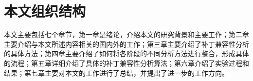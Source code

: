 \section{本文组织结构}

本文主要包括七个章节，第一章是绪论，介绍本文的研究背景和主要工作；第二章主要介绍与本文所述内容相关的国内外的工作；第三章主要介绍了补丁兼容性分析的具体方法；第四章主要介绍了如何将各阶段的不同分析方法进行整合，形成具体的流程；第五章详细介绍了具体的补丁兼容性分析算法；第六章介绍了实验过程和结果；第七章主要对本文的工作进行了总结，并提出了进一步的工作方向。


